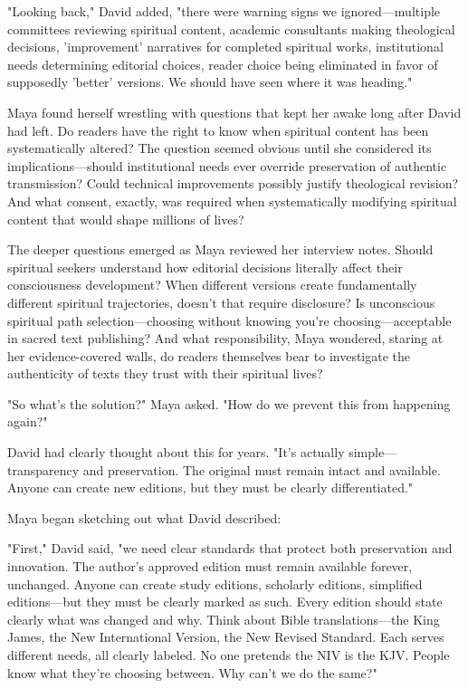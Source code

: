 \documentclass[12pt,twoside]{book}
\begin{document}
"Looking back," David added, "there were warning signs we ignored—multiple committees reviewing spiritual content, academic consultants making theological decisions, 'improvement' narratives for completed spiritual works, institutional needs determining editorial choices, reader choice being eliminated in favor of supposedly 'better' versions. We should have seen where it was heading."

Maya found herself wrestling with questions that kept her awake long after David had left. Do readers have the right to know when spiritual content has been systematically altered? The question seemed obvious until she considered its implications—should institutional needs ever override preservation of authentic transmission? Could technical improvements possibly justify theological revision? And what consent, exactly, was required when systematically modifying spiritual content that would shape millions of lives?

The deeper questions emerged as Maya reviewed her interview notes. Should spiritual seekers understand how editorial decisions literally affect their consciousness development? When different versions create fundamentally different spiritual trajectories, doesn't that require disclosure? Is unconscious spiritual path selection—choosing without knowing you're choosing—acceptable in sacred text publishing? And what responsibility, Maya wondered, staring at her evidence-covered walls, do readers themselves bear to investigate the authenticity of texts they trust with their spiritual lives?

"So what's the solution?" Maya asked. "How do we prevent this from happening again?"

David had clearly thought about this for years. "It's actually simple—transparency and preservation. The original must remain intact and available. Anyone can create new editions, but they must be clearly differentiated."

Maya began sketching out what David described:

"First," David said, "we need clear standards that protect both preservation and innovation. The author's approved edition must remain available forever, unchanged. Anyone can create study editions, scholarly editions, simplified editions—but they must be clearly marked as such. Every edition should state clearly what was changed and why. Think about Bible translations—the King James, the New International Version, the New Revised Standard. Each serves different needs, all clearly labeled. No one pretends the NIV is the KJV. People know what they're choosing between. Why can't we do the same?"
\end{document}
